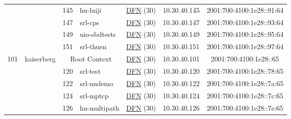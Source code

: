 \begin{small}
\begin{center}
\begin{longtable}{|c|c|c|c|c|c|c|c|}
  &  & \tiny{145} & \multicolumn{1}{|l|}{\tiny{hu-luiji}} & \multicolumn{2}{|c|}{\tiny{\href{https://www.dfn.de}{DFN} (30)}} & \tiny{10.30.40.145} & \tiny{2001:700:4100:1e28::91:64} \\* \cline{3-3}\cline{4-4}\cline{5-5}\cline{6-6}\cline{7-7}\cline{8-8}
  &  & \tiny{147} & \multicolumn{1}{|l|}{\tiny{srl-cps}} & \multicolumn{2}{|c|}{\tiny{\href{https://www.dfn.de}{DFN} (30)}} & \tiny{10.30.40.147} & \tiny{2001:700:4100:1e28::93:64} \\* \cline{3-3}\cline{4-4}\cline{5-5}\cline{6-6}\cline{7-7}\cline{8-8}
  &  & \tiny{149} & \multicolumn{1}{|l|}{\tiny{uio-sbdtests}} & \multicolumn{2}{|c|}{\tiny{\href{https://www.dfn.de}{DFN} (30)}} & \tiny{10.30.40.149} & \tiny{2001:700:4100:1e28::95:64} \\* \cline{3-3}\cline{4-4}\cline{5-5}\cline{6-6}\cline{7-7}\cline{8-8}
  &  & \tiny{151} & \multicolumn{1}{|l|}{\tiny{srl-thuen}} & \multicolumn{2}{|c|}{\tiny{\href{https://www.dfn.de}{DFN} (30)}} & \tiny{10.30.40.151} & \tiny{2001:700:4100:1e28::97:64} \\ \hline
 \multirow{17}{*}{\tiny{101}} & \multicolumn{1}{|l|}{\multirow{17}{*}{\tiny{kaiserberg}}} & \multicolumn{2}{|c|}{\tiny{Root Context}} & \multicolumn{2}{|c|}{\tiny{\href{https://www.dfn.de}{DFN} (30)}} & \tiny{10.30.40.101} & \tiny{2001:700:4100:1e28::65} \\* \cline{3-3}\cline{4-4}\cline{5-5}\cline{6-6}\cline{7-7}\cline{8-8}
  &  & \tiny{120} & \multicolumn{1}{|l|}{\tiny{srl-test}} & \multicolumn{2}{|c|}{\tiny{\href{https://www.dfn.de}{DFN} (30)}} & \tiny{10.30.40.120} & \tiny{2001:700:4100:1e28::78:65} \\* \cline{3-3}\cline{4-4}\cline{5-5}\cline{6-6}\cline{7-7}\cline{8-8}
  &  & \tiny{122} & \multicolumn{1}{|l|}{\tiny{srl-nndemo}} & \multicolumn{2}{|c|}{\tiny{\href{https://www.dfn.de}{DFN} (30)}} & \tiny{10.30.40.122} & \tiny{2001:700:4100:1e28::7a:65} \\* \cline{3-3}\cline{4-4}\cline{5-5}\cline{6-6}\cline{7-7}\cline{8-8}
  &  & \tiny{124} & \multicolumn{1}{|l|}{\tiny{srl-mptcp}} & \multicolumn{2}{|c|}{\tiny{\href{https://www.dfn.de}{DFN} (30)}} & \tiny{10.30.40.124} & \tiny{2001:700:4100:1e28::7c:65} \\* \cline{3-3}\cline{4-4}\cline{5-5}\cline{6-6}\cline{7-7}\cline{8-8}
  &  & \tiny{126} & \multicolumn{1}{|l|}{\tiny{hu-multipath}} & \multicolumn{2}{|c|}{\tiny{\href{https://www.dfn.de}{DFN} (30)}} & \tiny{10.30.40.126} & \tiny{2001:700:4100:1e28::7e:65} \\* \cline{3-3}\cline{4-4}\cline{5-5}\cline{6-6}\cline{7-7}\cline{8-8}

\end{longtable}
\end{center}
\end{small}
